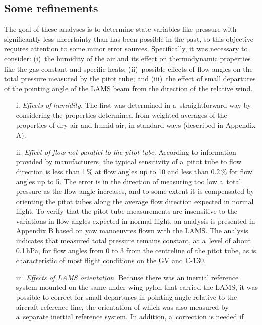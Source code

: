 \documentclass[amtd, online, hvmath]{copernicus}
\begin{document}
\subsection{Some refinements}

The goal of these analyses is to determine state variables like
pressure with significantly less uncertainty than has been possible in
the past, so this objective requires attention to some minor error
sources.  Specifically, it was necessary to consider: (i)~the humidity
of the air and its effect on thermodynamic properties like the gas
constant and specific heats; (ii)~possible effects of flow angles on
the total pressure measured by the pitot tube; and (iii)~the effect of
small departures of the pointing angle of the LAMS beam from the
direction of the relative wind.
\begin{enumerate}
\item[i.] \textit{Effects of humidity.} The first was determined in
  a~straightforward way by considering the properties determined from
  weighted averages of the properties of dry air and humid air, in
  standard ways (described in Appendix A).
\item[ii.] \textit{Effect of flow not parallel to the pitot tube.}
  According to information provided by manufacturers, the typical
  sensitivity of a~pitot tube to flow direction is less than 1\,{\%}
  at flow angles up to 10{\degree} and less than 0.2\,{\%} for flow
  angles up to 5{\degree}. The error is in the direction of measuring
  too low a~total pressure as the flow angle increases, and to some
  extent it is compensated by orienting the pitot tubes along the
  average flow direction expected in normal flight. To verify that the
  pitot-tube measurements are insensitive to the variations in flow
  angles expected in normal flight, an analysis is presented in
  Appendix B based on yaw manoeuvres flown with the LAMS. The analysis
  indicates that measured total pressure remains constant, at a~level
  of about 0.1\,hPa, for flow angles from 0 to 3{\degree} from the
  centreline of the pitot tube, as is characteristic of most flight
  conditions on the GV and C-130.
\item[iii.] \textit{Effects of LAMS orientation.} Because there was
  an inertial reference system mounted on the same under-wing pylon
  that carried the LAMS, it was possible to correct for small
  departures in pointing angle relative to the aircraft reference
  line, the orientation of which was also measured by a~separate
  inertial reference system.  In addition, a~correction is needed if

\end{enumerate}
\end{document}
